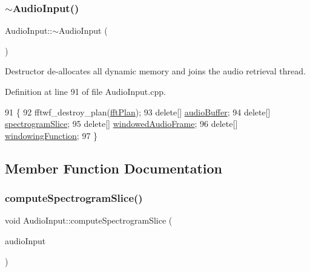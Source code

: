 \mbox{\label{classAudioInput_aaf278510da0fee4ccfd44c679067d96c}} 
\subsubsection{\texorpdfstring{$\sim$\+Audio\+Input()}{~AudioInput()}}
{\footnotesize\ttfamily Audio\+Input\+::$\sim$\+Audio\+Input (\begin{DoxyParamCaption}{ }\end{DoxyParamCaption})\hspace{0.3cm}{\ttfamily [pure virtual]}}

Destructor de-\/allocates all dynamic memory and joins the audio retrieval thread. 

Definition at line 91 of file Audio\+Input.\+cpp.


\begin{DoxyCode}
91                         \{
92     fftwf\_destroy\_plan(\mbox{\hyperlink{classAudioInput_a9797094e75625173beae7e89497248b2}{fftPlan}});
93     \textcolor{keyword}{delete}[] \mbox{\hyperlink{classAudioInput_a797943485896a381ea80947c8b6a8488}{audioBuffer}};
94     \textcolor{keyword}{delete}[] \mbox{\hyperlink{classAudioInput_aa277accc3be5054fe8439ac7086deaf5}{spectrogramSlice}};
95     \textcolor{keyword}{delete}[] \mbox{\hyperlink{classAudioInput_ae5a196a9ba111b7aa1ef64db6f092432}{windowedAudioFrame}};
96     \textcolor{keyword}{delete}[] \mbox{\hyperlink{classAudioInput_a72417120c208d81359f5b1205fc06664}{windowingFunction}};
97 \}
\end{DoxyCode}


\subsection{Member Function Documentation}
\mbox{\label{classAudioInput_a77614769e39be88bbf5d78adf84d9260}} 
\subsubsection{\texorpdfstring{compute\+Spectrogram\+Slice()}{computeSpectrogramSlice()}}
{\footnotesize\ttfamily void Audio\+Input\+::compute\+Spectrogram\+Slice (\begin{DoxyParamCaption}\item[{\mbox{\hyperlink{classAudioInput}{Audio\+Input}} $\ast$}]{audio\+Input }\end{DoxyParamCaption})\hspace{0.3cm}{\ttfamily [static]}}

